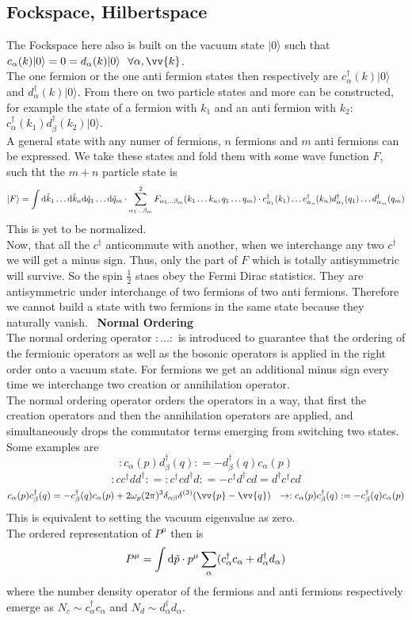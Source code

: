 \documentclass{include/thesisclass}
\newcommand{\cc}{\cdot}
\newcommand{\rk}{\rangle}
\newcommand{\vp}{\vv{p}}
\newcommand{\df}{\rightarrow}
\newcommand{\dd}{{\rm d}}
\newcommand{\sub}[1]{~\newline\newline\textbf{#1}\\}
\begin{document}
\subsection{Fockspace, Hilbertspace}
The Fockspace here also is built on the vacuum state $|0 \rk$ such that $c_\alpha(k)|0\rk = 0 = d_\alpha(k)|0\rk~~\forall \alpha,\vv{k}$.\\
The one fermion or the one anti fermion states then respectively are $c^\dagger_\alpha(k)|0\rk$ and $ d_\alpha^\dagger(k)|0 \rk$. From there on two particle states and more can be constructed, for example the state of a fermion with $k_1$ and an anti fermion with $k_2$: $c_\alpha^\dagger(k_1)d_\beta^\dagger(k_2)|0\rk$.\\
A general state with any numer of fermions, $n$ fermions and $m$ anti fermions can be expressed. We take these states and fold them with some wave function $F$, such tht the $m+n$ particle state is 
\[ |F\rk = \int \dd \tilde k_1 \ldots \dd \tilde k_n \dd \tilde q_1 \ldots \dd \tilde q_m \cc \sum_{\alpha_1 \ldots \beta_m}^2 F_{\alpha_1\ldots\beta_m} (k_1\ldots k_n,q_1\ldots q_m) \cc c_{\alpha_1}^\dagger(k_1)\ldots c_{\alpha_n}^\dagger(k_n) d_{\alpha_1}^\dagger(q_1)\ldots d_{\alpha_m}^\dagger(q_m)\]
This is yet to be normalized.\\
Now, that all the $c^\dagger$ anticommute with another, when we interchange any two $c^\dagger$ we will get a minus sign.
Thus, only the part of $F$ which is totally antisymmetric will survive.
So the spin $\frac{1}{2}$ staes obey the Fermi Dirac statistics. They are antisymmetric under interchange of two fermions of two anti fermions.
Therefore we cannot build a state with two fermions in the same state because they naturally vanish.
\sub{Normal Ordering}
The normal ordering operator $: \ldots :$ is introduced to guarantee that the ordering of the fermionic operators as well as the bosonic operators is applied in the right order onto a vacuum state. 
For fermions we get an additional minus sign every time we interchange two creation or annihilation operator.\\
The normal ordering operator orders the operators in a way, that first the creation operators and then the annihilation operators are applied, and simultaneously drops the commutator terms emerging from switching two states.\\
Some examples are
\[ : c_\alpha(p)d_\beta^\dagger(q): = - d_\beta^\dagger(q) c_\alpha(p)\]
\[: c c^\dagger d d^\dagger: = : c^\dagger c d^\dagger d: =- c^\dagger d^\dagger c d = d^\dagger c^\dagger c d\]
\[c_\alpha(p) c_\beta^\dagger(q) = - c_\beta^\dagger(q) c_\alpha(p) + 2\omega_p (2\pi)^3 \delta_{\alpha\beta} \delta^{(3)}(\vp - \vv{q}) ~~\df :c_\alpha(p) c_\beta^\dagger(q): = - c_\beta^\dagger(q) c_\alpha(p)\]
This is equivalent to setting the vacuum eigenvalue as zero.\\
The ordered representation of $P^\mu $ then is
\[ P^\mu = \int \dd \tilde p \cc p ^\mu \sum_\alpha (c_\alpha^\dagger c_\alpha + d^\dagger_\alpha d_\alpha)\]
where the number density operator of the fermions and anti fermions respectively emerge as $N_c \sim c_\alpha^\dagger c_\alpha$ and $N_d \sim d_\alpha^\dagger d_\alpha$.
\end{document}
